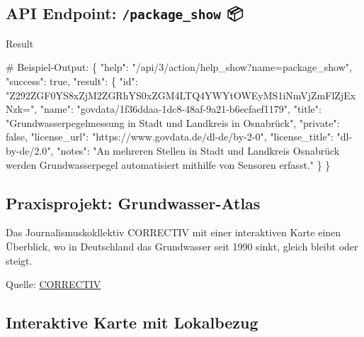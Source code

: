 \documentclass[
  letterpaper,
  DIV=11]{scrartcl}
\newenvironment{Shaded}{\begin{snugshade}}{\end{snugshade}}
\newcommand{\CommentTok}[1]{\textcolor[rgb]{0.37,0.37,0.37}{#1}}
\newcommand{\NormalTok}[1]{\textcolor[rgb]{0.00,0.23,0.31}{#1}}
\newcommand{\StringTok}[1]{\textcolor[rgb]{0.13,0.47,0.30}{#1}}
\begin{document}
\subsection{\texorpdfstring{API Endpoint:
\textbf{\texttt{/package\_show}}
📦}{API Endpoint: /package\_show 📦}}\label{api-endpoint-package_show-1}

Result

\begin{Shaded}
\begin{Highlighting}[]
\CommentTok{\# Beispiel{-}Output:}
\NormalTok{\{}
    \StringTok{"help"}\NormalTok{: }\StringTok{"/api/3/action/help\_show?name=package\_show"}\NormalTok{,}
    \StringTok{"success"}\NormalTok{: true,}
    \StringTok{"result"}\NormalTok{: \{}
        \StringTok{"id"}\NormalTok{: }\StringTok{"Z292ZGF0YS8xZjM2ZGRhYS0xZGM4LTQ4YWYtOWEyMS1iNmVjZmFlZjExNzk="}\NormalTok{,}
        \StringTok{"name"}\NormalTok{: }\StringTok{"govdata/1f36ddaa{-}1dc8{-}48af{-}9a21{-}b6ecfaef1179"}\NormalTok{,}
        \StringTok{"title"}\NormalTok{: }\StringTok{"Grundwasserpegelmessung in Stadt und Landkreis in Osnabrück"}\NormalTok{,}
        \StringTok{"private"}\NormalTok{: false,}
        \StringTok{"license\_url"}\NormalTok{: }\StringTok{"https://www.govdata.de/dl{-}de/by{-}2{-}0"}\NormalTok{,}
        \StringTok{"license\_title"}\NormalTok{: }\StringTok{"dl{-}by{-}de/2.0"}\NormalTok{,}
        \StringTok{"notes"}\NormalTok{: }\StringTok{"An mehreren Stellen in Stadt und Landkreis Osnabrück werden Grundwasserpegel automatisiert mithilfe von Sensoren erfasst."}
\NormalTok{    \}}
\NormalTok{\}}
\end{Highlighting}
\end{Shaded}

\subsection{Praxisprojekt:
Grundwasser-Atlas}\label{praxisprojekt-grundwasser-atlas}

Das Journalismuskokllektiv CORRECTIV mit einer interaktiven Karte einen
Überblick, wo in Deutschland das Grundwasser seit 1990 sinkt, gleich
bleibt oder steigt.

Quelle:
\href{https://correctiv.org/aktuelles/kampf-um-wasser/2022/10/25/klimawandel-grundwasser-in-deutschland-sinkt/}{CORRECTIV}

\subsection{Interaktive Karte mit
Lokalbezug}\label{interaktive-karte-mit-lokalbezug}
\end{document}

